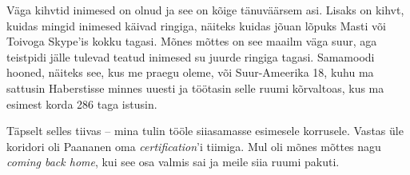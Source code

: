 Väga kihvtid inimesed on olnud ja see on kõige tänuväärsem asi. Lisaks on kihvt, kuidas mingid inimesed käivad ringiga, näiteks kuidas 
jõuan lõpuks Masti või Toivoga 
Skype'is kokku tagasi. Mõnes mõttes on see maailm väga suur, aga teistpidi 
jälle tulevad teatud inimesed su juurde ringiga tagasi. Samamoodi hooned, näiteks see, kus me praegu oleme, või Suur-Ameerika 18, kuhu ma sattusin 
Haberstisse minnes uuesti ja töötasin selle ruumi kõrvaltoas, kus ma esimest korda 
286 taga istusin. 


Täpselt selles tiivas -- mina tulin tööle siiasamasse esimesele korrusele. 
Vastas üle koridori oli Paananen oma 
\emph{certification}'i tiimiga. Mul oli mõnes mõttes nagu \emph{coming 
back home}, kui see osa valmis sai ja meile siia ruumi 
pakuti. 